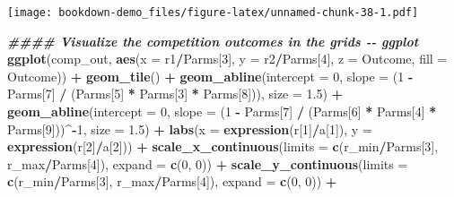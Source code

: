 \documentclass[
]{book}
\newenvironment{Shaded}{\begin{snugshade}}{\end{snugshade}}
\newcommand{\AttributeTok}[1]{\textcolor[rgb]{0.13,0.29,0.53}{#1}}
\newcommand{\DecValTok}[1]{\textcolor[rgb]{0.00,0.00,0.81}{#1}}
\newcommand{\DocumentationTok}[1]{\textcolor[rgb]{0.56,0.35,0.01}{\textbf{\textit{#1}}}}
\newcommand{\FloatTok}[1]{\textcolor[rgb]{0.00,0.00,0.81}{#1}}
\newcommand{\FunctionTok}[1]{\textcolor[rgb]{0.13,0.29,0.53}{\textbf{#1}}}
\newcommand{\NormalTok}[1]{#1}
\newcommand{\SpecialCharTok}[1]{\textcolor[rgb]{0.81,0.36,0.00}{\textbf{#1}}}
\begin{document}
\texttt{[image: bookdown-demo\_files/figure-latex/unnamed-chunk-38-1.pdf]}

\begin{Shaded}
\begin{Highlighting}[]
\DocumentationTok{\#\#\#\# Visualize the competition outcomes in the grids {-}{-} ggplot}
\FunctionTok{ggplot}\NormalTok{(comp\_out, }\FunctionTok{aes}\NormalTok{(}\AttributeTok{x =}\NormalTok{ r1}\SpecialCharTok{/}\NormalTok{Parms[}\DecValTok{3}\NormalTok{], }\AttributeTok{y =}\NormalTok{ r2}\SpecialCharTok{/}\NormalTok{Parms[}\DecValTok{4}\NormalTok{], }\AttributeTok{z =}\NormalTok{ Outcome, }\AttributeTok{fill =}\NormalTok{ Outcome)) }\SpecialCharTok{+}
  \FunctionTok{geom\_tile}\NormalTok{() }\SpecialCharTok{+}
  \FunctionTok{geom\_abline}\NormalTok{(}\AttributeTok{intercept =} \DecValTok{0}\NormalTok{, }\AttributeTok{slope =}\NormalTok{ (}\DecValTok{1} \SpecialCharTok{{-}}\NormalTok{ Parms[}\DecValTok{7}\NormalTok{] }\SpecialCharTok{/}\NormalTok{ (Parms[}\DecValTok{5}\NormalTok{] }\SpecialCharTok{*}\NormalTok{ Parms[}\DecValTok{3}\NormalTok{] }\SpecialCharTok{*}\NormalTok{ Parms[}\DecValTok{8}\NormalTok{])), }\AttributeTok{size =} \FloatTok{1.5}\NormalTok{) }\SpecialCharTok{+}
  \FunctionTok{geom\_abline}\NormalTok{(}\AttributeTok{intercept =} \DecValTok{0}\NormalTok{, }\AttributeTok{slope =}\NormalTok{ (}\DecValTok{1} \SpecialCharTok{{-}}\NormalTok{ Parms[}\DecValTok{7}\NormalTok{] }\SpecialCharTok{/}\NormalTok{ (Parms[}\DecValTok{6}\NormalTok{] }\SpecialCharTok{*}\NormalTok{ Parms[}\DecValTok{4}\NormalTok{] }\SpecialCharTok{*}\NormalTok{ Parms[}\DecValTok{9}\NormalTok{]))}\SpecialCharTok{\^{}{-}}\DecValTok{1}\NormalTok{, }\AttributeTok{size =} \FloatTok{1.5}\NormalTok{) }\SpecialCharTok{+}
  \FunctionTok{labs}\NormalTok{(}\AttributeTok{x =} \FunctionTok{expression}\NormalTok{(r[}\DecValTok{1}\NormalTok{]}\SpecialCharTok{/}\NormalTok{a[}\DecValTok{1}\NormalTok{]), }\AttributeTok{y =} \FunctionTok{expression}\NormalTok{(r[}\DecValTok{2}\NormalTok{]}\SpecialCharTok{/}\NormalTok{a[}\DecValTok{2}\NormalTok{])) }\SpecialCharTok{+}
  \FunctionTok{scale\_x\_continuous}\NormalTok{(}\AttributeTok{limits =} \FunctionTok{c}\NormalTok{(r\_min}\SpecialCharTok{/}\NormalTok{Parms[}\DecValTok{3}\NormalTok{], r\_max}\SpecialCharTok{/}\NormalTok{Parms[}\DecValTok{4}\NormalTok{]), }\AttributeTok{expand =} \FunctionTok{c}\NormalTok{(}\DecValTok{0}\NormalTok{, }\DecValTok{0}\NormalTok{)) }\SpecialCharTok{+}
  \FunctionTok{scale\_y\_continuous}\NormalTok{(}\AttributeTok{limits =} \FunctionTok{c}\NormalTok{(r\_min}\SpecialCharTok{/}\NormalTok{Parms[}\DecValTok{3}\NormalTok{], r\_max}\SpecialCharTok{/}\NormalTok{Parms[}\DecValTok{4}\NormalTok{]), }\AttributeTok{expand =} \FunctionTok{c}\NormalTok{(}\DecValTok{0}\NormalTok{, }\DecValTok{0}\NormalTok{)) }\SpecialCharTok{+}

\end{Highlighting}
\end{Shaded}
\end{document}
